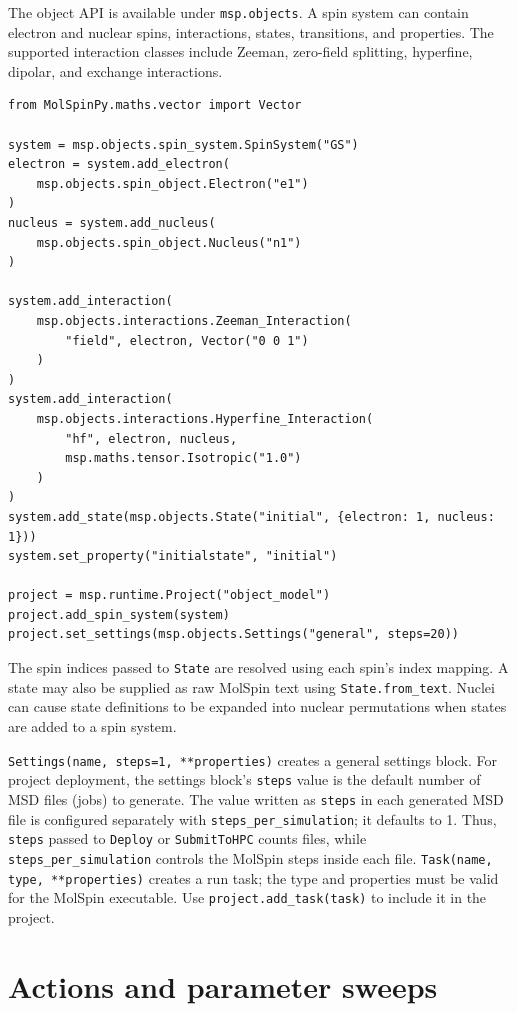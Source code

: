 \documentclass[11pt,a4paper]{article}
\begin{document}
The object API is available under \texttt{msp.objects}. A spin system can
contain electron and nuclear spins, interactions, states, transitions, and
properties. The supported interaction classes include Zeeman, zero-field
splitting, hyperfine, dipolar, and exchange interactions.

\begin{lstlisting}
from MolSpinPy.maths.vector import Vector

system = msp.objects.spin_system.SpinSystem("GS")
electron = system.add_electron(
    msp.objects.spin_object.Electron("e1")
)
nucleus = system.add_nucleus(
    msp.objects.spin_object.Nucleus("n1")
)

system.add_interaction(
    msp.objects.interactions.Zeeman_Interaction(
        "field", electron, Vector("0 0 1")
    )
)
system.add_interaction(
    msp.objects.interactions.Hyperfine_Interaction(
        "hf", electron, nucleus,
        msp.maths.tensor.Isotropic("1.0")
    )
)
system.add_state(msp.objects.State("initial", {electron: 1, nucleus: 1}))
system.set_property("initialstate", "initial")

project = msp.runtime.Project("object_model")
project.add_spin_system(system)
project.set_settings(msp.objects.Settings("general", steps=20))
\end{lstlisting}

The spin indices passed to \texttt{State} are resolved using each spin's
index mapping. A state may also be supplied as raw MolSpin text using
\texttt{State.from\_text}. Nuclei can cause state definitions to be expanded
into nuclear permutations when states are added to a spin system.

\texttt{Settings(name, steps=1, **properties)} creates a general settings
block. For project deployment, the settings block's \texttt{steps} value is
the default number of MSD files (jobs) to generate. The value written as
\texttt{steps} in each generated MSD file is configured separately with
\texttt{steps\_per\_simulation}; it defaults to 1. Thus, \texttt{steps}
passed to \texttt{Deploy} or \texttt{SubmitToHPC} counts files, while
\texttt{steps\_per\_simulation} controls the MolSpin steps inside each file.
\texttt{Task(name, type, **properties)} creates a run task; the type and
properties must be valid for the MolSpin executable. Use
\texttt{project.add\_task(task)} to include it in the project.

\section{Actions and parameter sweeps}
\end{document}
